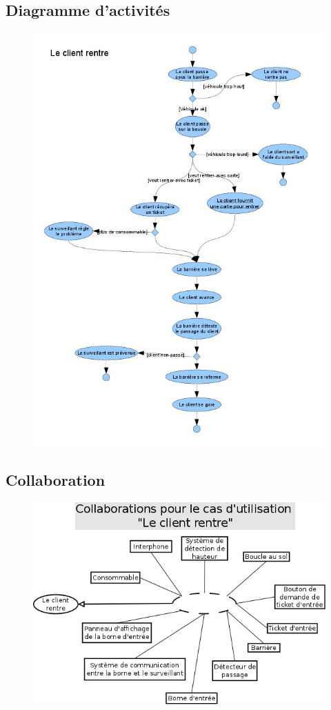 \documentclass[a4paper]{article}
\begin{document}
\subsection{Diagramme d'activit\'es}
\begin{figure}[!ht]
\centering
\includegraphics[scale=.7]{imgs/act_rentre.jpg}
\end{figure}

\subsection{Collaboration}
\begin{figure}[!ht]
\centering
\includegraphics[scale=.5]{collaborations/_rentre.png}
\end{figure}
\end{document}
